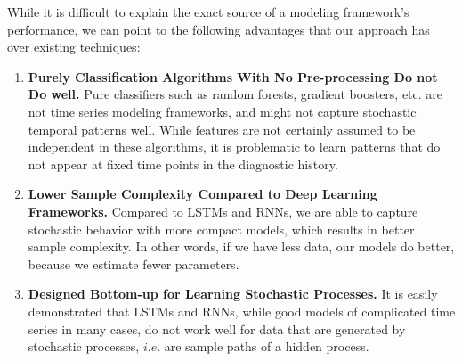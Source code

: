 \documentclass[onecolumn,,10pt]{IEEEtran}
\begin{document}
 {\HCOL While it is difficult to explain the exact source of a modeling framework's performance, we can point to the following advantages that our approach has over existing techniques:}
  \begin{enumerate}\HCOL
    \item \textbf{Purely Classification Algorithms With No Pre-processing Do not Do well.} Pure classifiers such as random forests, gradient boosters, etc. are not time series modeling frameworks, and might not capture stochastic temporal patterns well. While features are not certainly assumed to be independent in these algorithms, it is problematic to learn patterns that do not appear at fixed time points in the diagnostic history.
  \item \textbf{Lower Sample Complexity Compared to Deep Learning Frameworks.} Compared to LSTMs and RNNs, we are able to capture stochastic behavior with more compact models, which results in  better sample complexity. In other words, if we have less data, our models do better, because we estimate fewer parameters.
  \item \textbf{Designed Bottom-up for Learning Stochastic Processes.} It is easily demonstrated that LSTMs and RNNs, while good models of complicated time series in many cases, do not work well for data that are generated by stochastic processes, $i.e.$ are sample paths of a hidden process.
  \end{enumerate}
\end{document}
